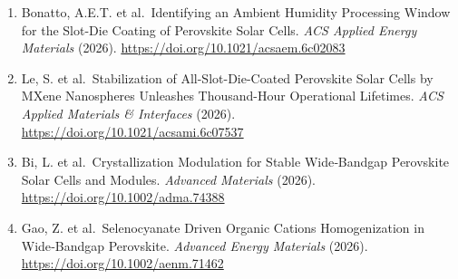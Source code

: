 \documentclass[
  11pt,
]{article}
\begin{document}
\begin{enumerate}
  Zhang, H. et al.~Fully Inorganic Hole Contacts Enabled by CeI3 for
  High-Performance Perovskite Solar Modules. \emph{ACS Nano} (2026).
  \url{https://doi.org/10.1021/acsnano.5c21962}
\item
  Bonatto, A.E.T. et al.~Identifying an Ambient Humidity Processing
  Window for the Slot-Die Coating of Perovskite Solar Cells. \emph{ACS
  Applied Energy Materials} (2026).
  \url{https://doi.org/10.1021/acsaem.6c02083}
\item
  Le, S. et al.~Stabilization of All-Slot-Die-Coated Perovskite Solar
  Cells by MXene Nanospheres Unleashes Thousand-Hour Operational
  Lifetimes. \emph{ACS Applied Materials \& Interfaces} (2026).
  \url{https://doi.org/10.1021/acsami.6c07537}
\item
  Bi, L. et al.~Crystallization Modulation for Stable Wide‐Bandgap
  Perovskite Solar Cells and Modules. \emph{Advanced Materials} (2026).
  \url{https://doi.org/10.1002/adma.74388}
\item
  Gao, Z. et al.~Selenocyanate Driven Organic Cations Homogenization in
  Wide‐Bandgap Perovskite. \emph{Advanced Energy Materials} (2026).
  \url{https://doi.org/10.1002/aenm.71462}
\end{enumerate}
\end{document}

